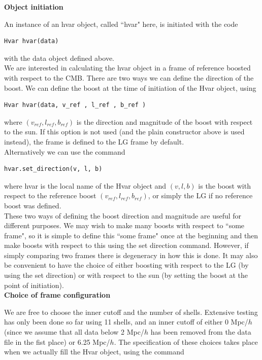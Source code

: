 \documentclass[11pt]{article}
\begin{document}
\textbf{Object initiation}

An instance of an hvar object, called ``hvar" here, is initiated with the code
\begin{verbatim}
Hvar hvar(data)
\end{verbatim}
with the data object defined above.\\

We are interested in calculating the hvar object in a frame of reference boosted with respect to the CMB.  There are two ways we can define the direction of the boost.  We can define the boost at the time of initiation of the Hvar object, using 
\begin{verbatim}
Hvar hvar(data, v_ref , l_ref , b_ref )
\end{verbatim}
where $(v_{ref},l_{ref},b_{ref})$ is the direction and magnitude of the boost with respect to the sun.  If this option is not used (and the plain constructor above is used instead), the frame is defined to the LG frame by default.\\

Alternatively we can use the command
\begin{verbatim}
hvar.set_direction(v, l, b)
\end{verbatim}
where hvar is the local name of the Hvar object and $(v,l,b)$ is the boost with respect to the reference boost $(v_{ref},l_{ref},b_{ref})$, or simply the LG if no reference boost was defined.\\

These two ways of defining the boost direction and magnitude are useful for different purposes.  We may wish to make many boosts with respect to ``some frame", so it is simple to define this ``some frame" once at the beginning and then make boosts with respect to this using the set direction command.  However, if simply comparing two frames there is degeneracy in how this is done.  It may also be convenient to have the choice of either boosting with respect to the LG (by using the set direction) or with respect to the sun (by setting the boost at the point of initiation).\\

\textbf{Choice of frame configuration}

We are free to choose the inner cutoff and the number of shells.  Extensive testing has only been done so far using 11 shells, and an inner cutoff of either 0 Mpc/$h$ (since we assume that all data below 2 Mpc/$h$ has been removed from the data file in the fist place) or 6.25 Mpc/$h$.  The specification of these choices takes place when we actually fill the Hvar object, using the command
\end{document}
